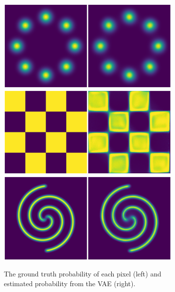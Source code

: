 \documentclass{article}
\begin{document}
\begin{figure}[t]
    \centering
    \begin{subfigure}[b]{0.48\textwidth}
        \centering
                \includegraphics[width=\linewidth]{figures/prob8g_iwae.png}
                \includegraphics[width=\linewidth]{figures/probc_iwae.png}
                \includegraphics[width=\linewidth]{figures/prob2s_iwae.png}
        \caption{The ground truth probability of each pixel (left) and estimated probability from the VAE (right).} \label{fig:density_iwae}
    \end{subfigure}
        \begin{subfigure}[b]{0.48\textwidth}

\end{subfigure}
\end{figure}
\end{document}
